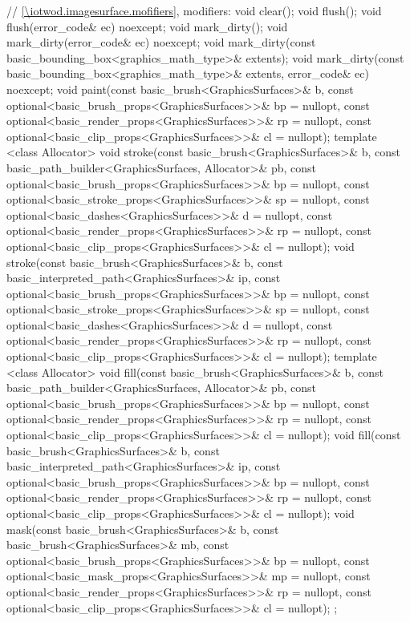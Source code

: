 \begin{codeblock}
{{    // \ref{\iotwod.imagesurface.mofifiers}, modifiers:
    void clear();
    void flush();
    void flush(error_code& ec) noexcept;
    void mark_dirty();
    void mark_dirty(error_code& ec) noexcept;
    void mark_dirty(const basic_bounding_box<graphics_math_type>& extents);
    void mark_dirty(const basic_bounding_box<graphics_math_type>& extents,
      error_code& ec) noexcept;
    void paint(const basic_brush<GraphicsSurfaces>& b,
      const optional<basic_brush_props<GraphicsSurfaces>>& bp = nullopt,
      const optional<basic_render_props<GraphicsSurfaces>>& rp = nullopt,
      const optional<basic_clip_props<GraphicsSurfaces>>& cl = nullopt);
    template <class Allocator>
    void stroke(const basic_brush<GraphicsSurfaces>& b,
      const basic_path_builder<GraphicsSurfaces, Allocator>& pb,
      const optional<basic_brush_props<GraphicsSurfaces>>& bp = nullopt,
      const optional<basic_stroke_props<GraphicsSurfaces>>& sp = nullopt,
      const optional<basic_dashes<GraphicsSurfaces>>& d = nullopt,
      const optional<basic_render_props<GraphicsSurfaces>>& rp = nullopt,
      const optional<basic_clip_props<GraphicsSurfaces>>& cl = nullopt);
    void stroke(const basic_brush<GraphicsSurfaces>& b,
      const basic_interpreted_path<GraphicsSurfaces>& ip,
      const optional<basic_brush_props<GraphicsSurfaces>>& bp = nullopt,
      const optional<basic_stroke_props<GraphicsSurfaces>>& sp = nullopt,
      const optional<basic_dashes<GraphicsSurfaces>>& d = nullopt,
      const optional<basic_render_props<GraphicsSurfaces>>& rp = nullopt,
      const optional<basic_clip_props<GraphicsSurfaces>>& cl = nullopt);
    template <class Allocator>
    void fill(const basic_brush<GraphicsSurfaces>& b,
      const basic_path_builder<GraphicsSurfaces, Allocator>& pb,
      const optional<basic_brush_props<GraphicsSurfaces>>& bp = nullopt,
      const optional<basic_render_props<GraphicsSurfaces>>& rp = nullopt,
      const optional<basic_clip_props<GraphicsSurfaces>>& cl = nullopt);
    void fill(const basic_brush<GraphicsSurfaces>& b,
      const basic_interpreted_path<GraphicsSurfaces>& ip,
      const optional<basic_brush_props<GraphicsSurfaces>>& bp = nullopt,
      const optional<basic_render_props<GraphicsSurfaces>>& rp = nullopt,
      const optional<basic_clip_props<GraphicsSurfaces>>& cl = nullopt);
    void mask(const basic_brush<GraphicsSurfaces>& b,
      const basic_brush<GraphicsSurfaces>& mb,
      const optional<basic_brush_props<GraphicsSurfaces>>& bp = nullopt,
      const optional<basic_mask_props<GraphicsSurfaces>>& mp = nullopt,
      const optional<basic_render_props<GraphicsSurfaces>>& rp = nullopt,
      const optional<basic_clip_props<GraphicsSurfaces>>& cl = nullopt);
  };
}
\end{codeblock}

